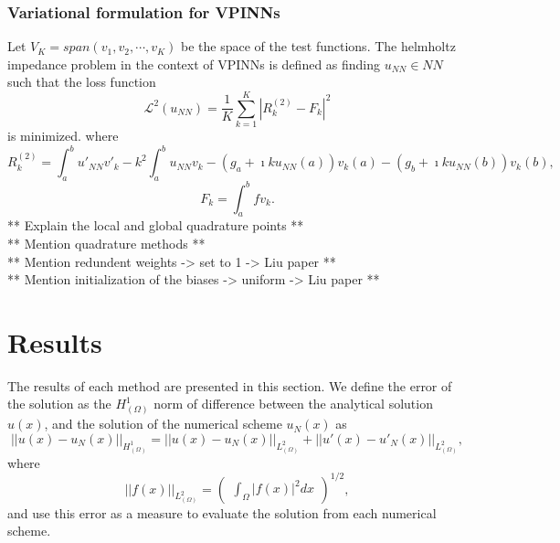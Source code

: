 \subsubsection{Variational formulation for VPINNs}\label{sec:vpinnsformulation}
Let $V_K = span(v_1, v_2, \cdots, v_K)$ be the space of the test functions. The helmholtz impedance problem in the context
of VPINNs is defined as finding $u_{NN} \in NN$ such that the loss function
\begin{equation}
    \label{eq:lossfunction}
    \mathcal{L}^2(u_{NN}) = \frac{1}{K} \sum_{k=1}^{K}{|R_k^{(2)} - F_k|^2}
\end{equation}
is minimized. where
\begin{equation}
    \label{eq:vpinnrhs}
    R_k^{(2)} = \int_{a}^{b}{u'_{NN}v'_k} - k^2 \int_{a}^{b}{u_{NN}v_k} - (g_a + \imath ku_{NN}(a))v_k(a) - (g_b + \imath ku_{NN}(b))v_k(b),
\end{equation}
\begin{equation}
    \label{eq:vpinnlhs}
    F_k = \int_{a}^{b}{fv_k}.
\end{equation}
** Explain the local and global quadrature points **\\
** Mention quadrature methods **\\
** Mention redundent weights -> set to 1 -> Liu paper **\\
** Mention initialization of the biases -> uniform -> Liu paper **\\


\section{Results}\label{sec:results}
The results of each method are presented in this section. We define the error of the solution as the $H^1_{(\Omega)}$
norm of difference between the analytical solution $u(x)$, and the solution of the numerical scheme $u_N(x)$ as
\begin{equation}
    \label{eq:H1error}
    ||u(x) - u_N(x)||_{H^1_{(\Omega)}} = ||u(x) - u_N(x)||_{L^2_{(\Omega)}} + ||u'(x) - u'_N(x)||_{L^2_{(\Omega)}},
\end{equation}
where
\begin{equation}
    \label{eq:L2error}
    ||f(x)||_{L^2_{(\Omega)}} = \begin{pmatrix} \int_{\Omega}{|f(x)|^2dx} \end{pmatrix}^{1/2},
\end{equation}
and use this error as a measure to evaluate the solution from each numerical scheme.

